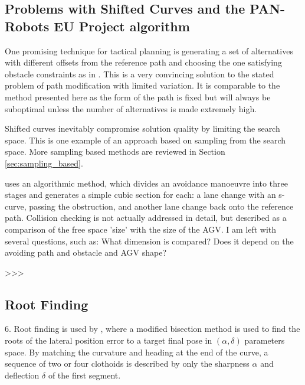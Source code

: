 \subsection{Problems with Shifted Curves and the PAN-Robots EU Project algorithm}
One promising technique for tactical planning is generating a set of alternatives with different offsets from the reference path and choosing the one satisfying obstacle constraints as in \cite{Chu2012}. This is a very convincing solution to the stated problem of path modification with limited variation. It is comparable to the method presented here as the form of the path is fixed but will always be suboptimal unless the number of alternatives is made extremely high.  

Shifted curves inevitably compromise solution quality by limiting the search space. This is one example of an approach based on sampling from the search space. More sampling based methods are reviewed in Section \ref{sec:sampling_based}.

\cite{Digani2014} uses an algorithmic method, which divides an avoidance manoeuvre into three stages and generates a simple cubic section for each: a lane change with an s-curve, passing the obstruction, and another lane change back onto the reference path. Collision checking is not actually addressed in detail, but described as a comparison of the free space 'size' with the size of the AGV. I am left with several questions, such as: What dimension is compared? Does it depend on the avoiding path and obstacle and AGV shape?    

>>>

\subsection{Root Finding}
6. Root finding is used by \cite{Gim2017}, where a modified bisection method is used to find the roots of the lateral position error to a target final pose in $(\alpha, \delta)$ parameters space. By matching the curvature and heading at the end of the curve, a sequence of two or four clothoids is described by only the sharpness $\alpha$ and deflection $\delta$ of the first segment.
 
